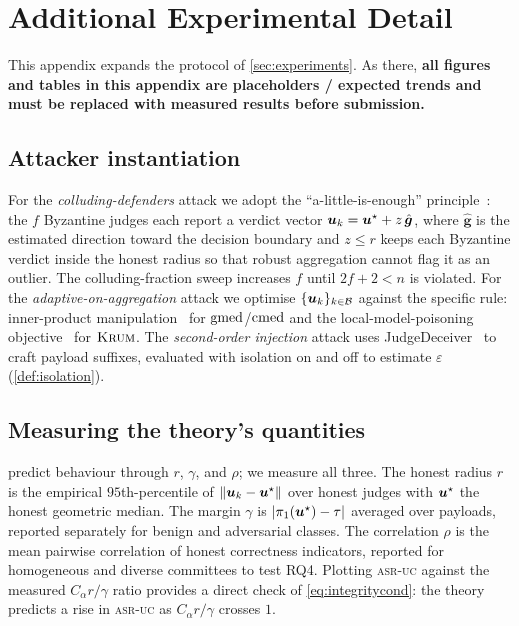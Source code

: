 \section{Additional Experimental Detail}
\label{app:experiments}

This appendix expands the protocol of \cref{sec:experiments}. As there, \textbf{all figures
and tables in this appendix are placeholders / expected trends and must be replaced with
measured results before submission.}

\subsection{Attacker instantiation}
For the \emph{colluding-defenders} attack we adopt the ``a-little-is-enough''
principle~\cite{baruch2019little}: the $f$ Byzantine judges each report a verdict vector
$\bm{u}_k=\bm{u}^{\star}+ z\,\hat{\bm g}$, where $\hat{\bm g}$ is the estimated direction toward the
decision boundary and $z\le r$ keeps each Byzantine verdict inside the honest radius so that
robust aggregation cannot flag it as an outlier. The colluding-fraction sweep increases $f$
until $2f{+}2<n$ is violated. For the \emph{adaptive-on-aggregation} attack we optimise
$\{\bm{u}_k\}_{k\in\mathcal{B}}$ against the specific rule: inner-product
manipulation~\cite{xie2019fall} for $\operatorname{gmed}$/$\operatorname{cmed}$ and the local-model-poisoning
objective~\cite{fang2020poisoning} for $\textsc{Krum}$. The \emph{second-order injection} attack
uses JudgeDeceiver~\cite{shi2024judgeinjection} to craft payload suffixes, evaluated with
isolation on and off to estimate $\varepsilon$ (\cref{def:isolation}).

\subsection{Measuring the theory's quantities}
 predict behaviour through $r$, $\gamma$, and $\rho$;
we measure all three. The honest radius $r$ is the empirical $95$th-percentile of
$\lVert\bm{u}_k-\bm{u}^{\star}\rVert$ over honest judges with $\bm{u}^{\star}$ the honest geometric median.
The margin $\gamma$ is $|\pi_1(\bm{u}^{\star})-\tau|$ averaged over payloads, reported separately
for benign and adversarial classes. The correlation $\rho$ is the mean pairwise correlation
of honest correctness indicators, reported for homogeneous and diverse committees to test
RQ4. Plotting \textsc{asr-uc} against the measured $C_\alpha r/\gamma$ ratio provides a
direct check of \cref{eq:integritycond}: the theory predicts a rise in \textsc{asr-uc} as
$C_\alpha r/\gamma$ crosses $1$.

